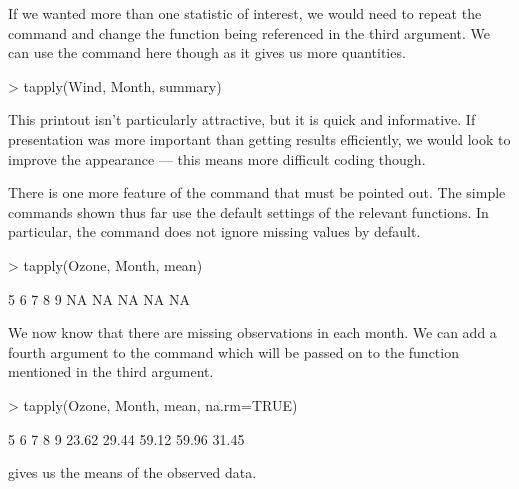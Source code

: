 If we wanted more than one statistic of interest, we would need to repeat the command and change the function being referenced in the third argument. We can use the  command here though as it gives us more quantities. 
\begin{Schunk}
\begin{Sinput}
> tapply(Wind, Month, summary) 
\end{Sinput}
\end{Schunk}
 
This printout isn't particularly attractive, but it is quick and informative. If presentation was more important than getting results efficiently, we would look to improve the appearance --- this means more difficult coding though. 
 
There is one more feature of the  command that must be pointed out. The simple commands shown thus far use the default settings of the relevant functions. In particular, the  command does not ignore missing values by default. 
\begin{Schunk}
\begin{Sinput}
> tapply(Ozone, Month, mean) 
\end{Sinput}
\begin{Soutput}
 5  6  7  8  9 
NA NA NA NA NA 
\end{Soutput}
\end{Schunk}
We now know that there are missing  observations in each month. We can add a fourth argument to the command which will be passed on to the function mentioned in the third argument. 
\begin{Schunk}
\begin{Sinput}
> tapply(Ozone, Month, mean, na.rm=TRUE) 
\end{Sinput}
\begin{Soutput}
    5     6     7     8     9 
23.62 29.44 59.12 59.96 31.45 
\end{Soutput}
\end{Schunk}
gives us the means of the observed data. 
 
